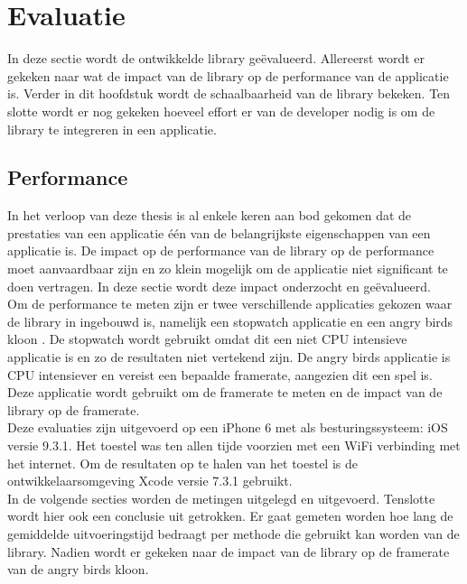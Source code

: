 \chapter{Evaluatie}
In deze sectie wordt de ontwikkelde library ge\"evalueerd. Allereerst wordt er gekeken naar wat de impact van de library op de performance van de applicatie is. Verder in dit hoofdstuk wordt de schaalbaarheid van de library bekeken. Ten slotte wordt er nog gekeken hoeveel effort er van de developer nodig is om de library te integreren in een applicatie.


\section{Performance}
In het verloop van deze thesis is al enkele keren aan bod gekomen dat de prestaties van een applicatie \'e\'en van de belangrijkste eigenschappen van een applicatie is. De impact op de performance van de library op de performance moet aanvaardbaar zijn en zo klein mogelijk om de applicatie niet significant te doen vertragen. In deze sectie wordt deze impact onderzocht en ge\"evalueerd. \\

Om de performance te meten zijn er twee verschillende applicaties gekozen waar de library in ingebouwd is, namelijk een stopwatch applicatie en een angry birds kloon \cite{AngryBirds}. De stopwatch wordt gebruikt omdat dit een niet CPU intensieve applicatie is en zo de resultaten niet vertekend zijn. De angry birds applicatie is CPU intensiever en vereist een bepaalde framerate, aangezien dit een spel is. Deze applicatie wordt gebruikt om de framerate te meten en de impact van de library op de framerate. \\

Deze evaluaties zijn uitgevoerd op een iPhone 6 \cite{iPhone} met als besturingssysteem: iOS versie 9.3.1. Het toestel was ten allen tijde voorzien met een WiFi verbinding met het internet. Om de resultaten op te halen van het toestel is de ontwikkelaarsomgeving Xcode \cite{Xcode} versie 7.3.1 gebruikt.\\

In de volgende secties worden de metingen uitgelegd en uitgevoerd. Tenslotte wordt hier ook een conclusie uit getrokken. Er gaat gemeten worden hoe lang de gemiddelde uitvoeringstijd bedraagt per methode die gebruikt kan worden van de library. Nadien wordt er gekeken naar de impact van de library op de framerate van de angry birds kloon.\\

